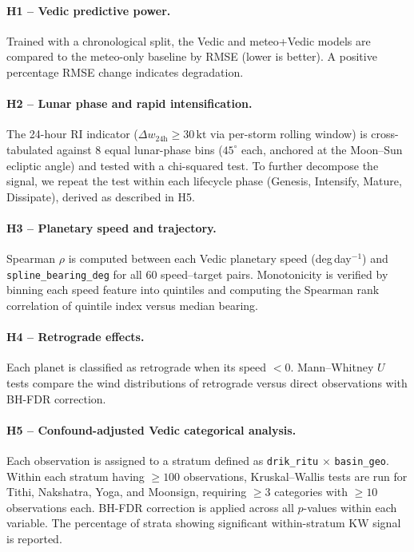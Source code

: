 \documentclass[12pt,a4paper]{article}
\begin{document}
\paragraph{H1 -- Vedic predictive power.}
Trained with a chronological split, the Vedic and meteo+Vedic models are
compared to the meteo-only baseline by RMSE (lower is better).
A positive percentage RMSE change indicates degradation.

\paragraph{H2 -- Lunar phase and rapid intensification.}
The 24-hour RI indicator ($\Delta w_\text{24h} \geq 30\,\text{kt}$ via
per-storm rolling window) is cross-tabulated against 8 equal lunar-phase bins
($45^\circ$ each, anchored at the Moon--Sun ecliptic angle) and tested with a
chi-squared test.
To further decompose the signal, we repeat the test within each lifecycle phase
(Genesis, Intensify, Mature, Dissipate), derived as described in H5.

\paragraph{H3 -- Planetary speed and trajectory.}
Spearman $\rho$ is computed between each Vedic planetary speed
(deg\,day$^{-1}$) and \texttt{spline\_bearing\_deg} for all 60 speed--target
pairs.
Monotonicity is verified by binning each speed feature into quintiles and
computing the Spearman rank correlation of quintile index versus median bearing.

\paragraph{H4 -- Retrograde effects.}
Each planet is classified as retrograde when its speed $< 0$.
Mann--Whitney $U$ tests compare the wind distributions of retrograde versus
direct observations with BH-FDR correction.

\paragraph{H5 -- Confound-adjusted Vedic categorical analysis.}
Each observation is assigned to a stratum defined as
\texttt{drik\_ritu} $\times$ \texttt{basin\_geo}.
Within each stratum having $\geq 100$ observations, Kruskal--Wallis tests are
run for Tithi, Nakshatra, Yoga, and Moonsign, requiring $\geq 3$ categories
with $\geq 10$ observations each.
BH-FDR correction is applied across all $p$-values within each variable.
The percentage of strata showing significant within-stratum KW signal is
reported.
\end{document}
